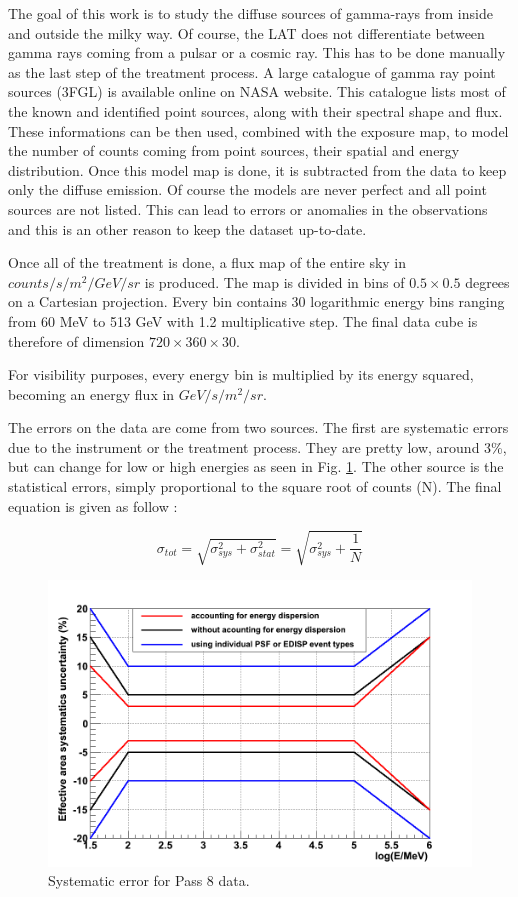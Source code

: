 The goal of this work is to study the diffuse sources of gamma-rays from inside and outside the milky way. Of course, the LAT does not differentiate between gamma rays coming from a pulsar or a cosmic ray. This has to be done manually as the last step of the treatment process. A large catalogue of gamma ray point sources (3FGL) is available online on NASA website. This catalogue lists most of the known and identified point sources, along with their spectral shape and flux. These informations can be then used, combined with the exposure map, to model the number of counts coming from point sources, their spatial and energy distribution. Once this model map is done, it is subtracted from the data to keep only the diffuse emission. Of course the models are never perfect and all point sources are not listed. This can lead to errors or anomalies in the observations and this is an other reason to keep the dataset up-to-date.

Once all of the treatment is done, a flux map of the entire sky in $counts/s/m^2/GeV/sr$ is produced. The map is divided in bins of $0.5 \times 0.5$ degrees on a Cartesian projection. Every bin contains 30 logarithmic energy bins ranging from 60 MeV to 513 GeV with 1.2 multiplicative step. The final data cube is therefore of dimension $720 \times 360 \times 30$.

For visibility purposes, every energy bin is multiplied by its energy squared, becoming an energy flux in $GeV/s/m^2/sr$.

The errors on the data are come from two sources. The first are systematic errors due to the instrument or the treatment process. They are pretty low, around 3\%, but can change for low or high energies as seen in Fig. \ref{fig:LAT_sys_err}. The other source is the statistical errors, simply proportional to the square root of counts (N). The final equation is given as follow :

\begin{equation}
\sigma_{tot} =\sqrt{\sigma_{sys}^2 + \sigma_{stat}^2} = \sqrt{\sigma_{sys}^2 + \frac{1}{N}}
\end{equation}


\begin{figure}[h]
 \centering
 \includegraphics[width=.9\linewidth]{pic/method/LAT_sys_error.png}
 \caption{Systematic error for Pass 8 data.}
 \label{fig:LAT_sys_err}
\end{figure}


